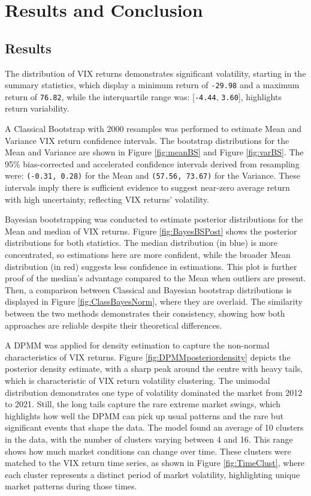\documentclass[12pt]{report} %
\begin{document}
\chapter{Results and Conclusion}
\section{Results}
The distribution of VIX returns demonstrates significant volatility, starting in the summary statistics, which display a minimum return of \texttt{-29.98} and a maximum return of \texttt{76.82}, while the interquartile range was: [\texttt{-4.44}, \texttt{3.60}], highlights return variability.  

A Classical Bootstrap with 2000 resamples was performed to estimate Mean and Variance VIX return confidence intervals. The bootstrap distributions for the Mean and Variance are shown in Figure \ref{fig:meanBS} and Figure \ref{fig:varBS}. The 95\% bias-corrected and accelerated confidence intervals derived from resampling were: \texttt{(-0.31, 0.28)} for the Mean and  \texttt{(57.56, 73.67)} for the Variance. These intervals imply there is sufficient evidence to suggest near-zero average return with high uncertainty, reflecting  VIX returns' volatility.

Bayesian bootstrapping was conducted to estimate posterior distributions for the Mean and median of VIX returns. Figure \ref{fig:BayesBSPost} shows the posterior distributions for both statistics. The median distribution (in blue) is more concentrated, so estimations here are more confident, while the broader Mean distribution (in red) suggests less confidence in estimations. This plot is further proof of the median's advantage compared to the Mean when outliers are present. Then, a comparison between Classical and Bayesian bootstrap distributions is displayed in Figure \ref{fig:ClassBayesNorm}, where they are overlaid. The similarity between the two methods demonstrates their consistency, showing how both approaches are reliable despite their theoretical differences.

A DPMM was applied for density estimation to capture the non-normal characteristics of VIX returns. Figure \ref{fig:DPMMposteriordensity} depicts the posterior density estimate, with a sharp peak around the centre with heavy tails, which is characteristic of VIX return volatility clustering. The unimodal distribution demonstrates one type of volatility dominated the market from 2012 to 2021. Still, the long tails capture the rare extreme market swings, which highlights how well the DPMM can pick up usual patterns and the rare but significant events that shape the data. The model found an average of 10 clusters in the data, with the number of clusters varying between 4 and 16. This range shows how much market conditions can change over time. These clusters were matched to the VIX return time series, as shown in Figure \ref{fig:TimeClust}, where each cluster represents a distinct period of market volatility, highlighting unique market patterns during those times. 
\end{document}
